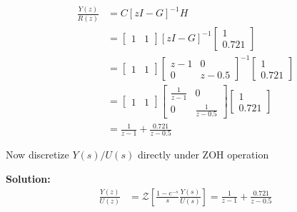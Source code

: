 \documentclass[twoside]{article}
\begin{document}
\begin{align*}
 \frac{Y(z)}{R(z)} &= C \left[ z I - G \right]^{-1} H
\\
&= \left[ \begin{array}{cc} 1 & 1 \end{array} \right] 
\left[ z I - G \right]^{-1}
\left[ \begin{array}{c} 1 \\ 0.721 \end{array} \right]
\\
&= \left[ \begin{array}{cc} 1 & 1 \end{array} \right] 
\left[ 
\begin{array}{cc} 
             z-1 & 0 \\ 0 & z-0.5
\end{array} 
\right]^{-1}
\left[ \begin{array}{c} 1 \\ 0.721 \end{array} \right]
\\
&= \left[ \begin{array}{cc} 1 & 1 \end{array} \right] 
\left[ 
\begin{array}{cc} 
            \frac{1}{z-1} & 0 \\ 0 & \frac{1}{z-0.5}
\end{array} 
\right]
\left[ \begin{array}{c} 1 \\ 0.721 \end{array} \right]
\\
&= \frac{1}{z-1} + \frac{0.721}{z-0.5}
\end{align*}

Now discretize $Y(s)/U(s)$ directly under ZOH operation
%

\textbf{Solution:}
%
\begin{align*}
 \frac{Y(z)}{U(z)} &= \mathcal{Z} \left[ \frac{1 - e^{-s}}{s}
                     \frac{Y(s)}{U(s)} \right] = \frac{1}{z-1} + \frac{0.721}{z-0.5}
\end{align*}

\end{document}
